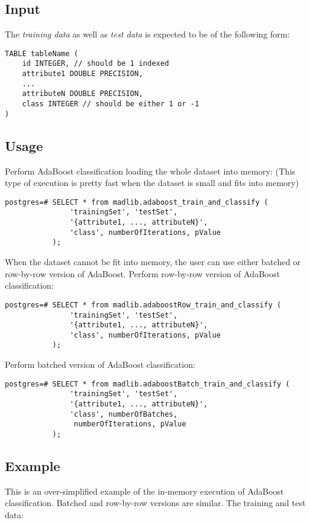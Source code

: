 \subsection*{Input}
The {\itshape training data} as well as {\itshape test data} is expected to be of the following form:

\begin{verbatim}
TABLE tableName (
    id INTEGER, // should be 1 indexed
    attribute1 DOUBLE PRECISION,
    ...
    attributeN DOUBLE PRECISION,
    class INTEGER // should be either 1 or -1
)
\end{verbatim}

\subsection*{Usage}
Perform AdaBoost classification loading the whole dataset into memory: (This type of execution is pretty fast when the dataset is small and fits into memory)

\begin{verbatim}
postgres=# SELECT * from madlib.adaboost_train_and_classify (
               'trainingSet', 'testSet', 
               '{attribute1, ..., attributeN}', 
               'class', numberOfIterations, pValue
           );
\end{verbatim}

When the dataset cannot be fit into memory, the user can use either batched or row-by-row version of AdaBoost.
\vspace{\baselineskip}
{\raggedleft Perform row-by-row version of AdaBoost classification:}

\begin{verbatim}
postgres=# SELECT * from madlib.adaboostRow_train_and_classify (
               'trainingSet', 'testSet', 
               '{attribute1, ..., attributeN}', 
               'class', numberOfIterations, pValue
           );
\end{verbatim}

{\raggedleft Perform batched version of AdaBoost classification:}

\begin{verbatim}
postgres=# SELECT * from madlib.adaboostBatch_train_and_classify (
               'trainingSet', 'testSet', 
               '{attribute1, ..., attributeN}', 
               'class', numberOfBatches,
                numberOfIterations, pValue
           );
\end{verbatim}

\subsection*{Example}
This is an over-simplified example of the in-memory execution of AdaBoost classification. Batched and row-by-row versions are similar.
\vspace{\baselineskip}
{\raggedleft The training and test data:}

